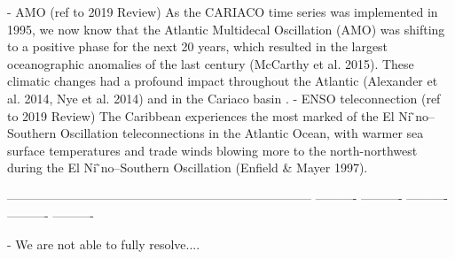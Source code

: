     - AMO (ref to 2019 Review)
    As the CARIACO time series was implemented in 1995, we now know that the Atlantic Multidecal Oscillation (AMO) was shifting to a positive phase for the next 20 years, which resulted in the largest oceanographic anomalies of the last century (McCarthy et al. 2015). These climatic changes had a profound impact throughout the Atlantic (Alexander et al. 2014, Nye et al. 2014) and in the Cariaco basin \cite{taylor_ecosystem_2012, pinckney_phytoplankton_2015}.
    - ENSO teleconnection (ref to 2019 Review)
    The Caribbean experiences the most marked of the El Ni  ̃no–Southern Oscillation teleconnections in the Atlantic Ocean, with warmer sea surface temperatures and trade winds blowing more to the north-northwest during the El Ni  ̃no–Southern Oscillation (Enfield & Mayer 1997).






 
--------------------------------------------------------------------------
----------
----------
----------
----------
----------




- We are not able to fully resolve....


